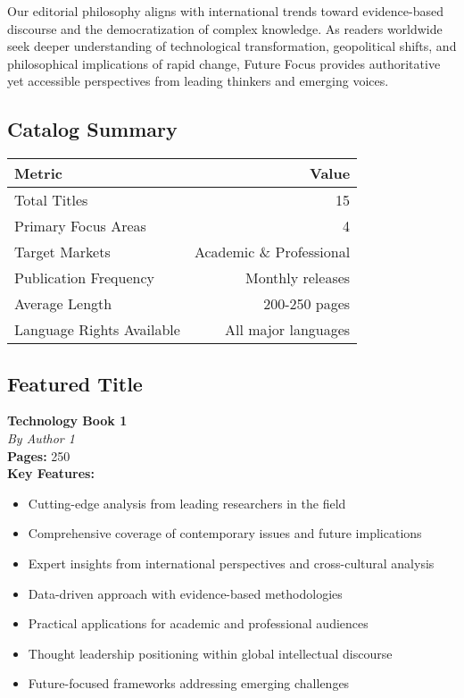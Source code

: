 \documentclass[11pt]{article}
\begin{document}
Our editorial philosophy aligns with international trends toward evidence-based discourse and the democratization of complex knowledge. As readers worldwide seek deeper understanding of technological transformation, geopolitical shifts, and philosophical implications of rapid change, Future Focus provides authoritative yet accessible perspectives from leading thinkers and emerging voices.

\subsection{Catalog Summary}

\begin{center}
\begin{tabular}{|l|r|}
\hline
\textbf{Metric} & \textbf{Value} \\
\hline
Total Titles & 15 \\
Primary Focus Areas & 4 \\
Target Markets & Academic \& Professional \\
Publication Frequency & Monthly releases \\
Average Length & 200-250 pages \\
Language Rights Available & All major languages \\
\hline
\end{tabular}
\end{center}

\subsection{Featured Title}

\textbf{Technology Book 1}\\
\textit{By Author 1} \\[0.4cm]

\textbf{Pages:} 250\\[0.3cm]

\textbf{Key Features:}
\begin{itemize}
\item Cutting-edge analysis from leading researchers in the field
\item Comprehensive coverage of contemporary issues and future implications
\item Expert insights from international perspectives and cross-cultural analysis
\item Data-driven approach with evidence-based methodologies
\item Practical applications for academic and professional audiences
\item Thought leadership positioning within global intellectual discourse
\item Future-focused frameworks addressing emerging challenges
\end{itemize}
\end{document}
